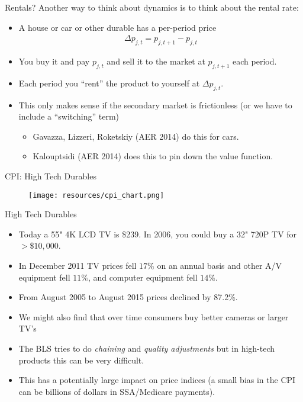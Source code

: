 \begin{frame}{Rentals?}
Another way to think about dynamics is to think about the rental rate:
\begin{itemize}
\item A house or car or other durable has a per-period price
\begin{align*}
\Delta p_{j,t}=p_{j,t+1} - p_{j,t}
\end{align*}
\item You buy it and pay $p_{j,t}$ and sell it to the market at $p_{j,t+1}$ each period.
\item Each period you ``rent'' the product to yourself at $\Delta p_{j,t}$.
\item This only makes sense if the secondary market is frictionless (or we have to include a ``switching'' term)
\begin{itemize}
	\item Gavazza, Lizzeri, Roketskiy (AER 2014) do this for cars.
	\item Kalouptsidi (AER 2014) does this to pin down the value function.
\end{itemize}
\end{itemize}
\end{frame}



\begin{frame}{CPI: High Tech Durables}
\begin{figure}[htbp]
\begin{center}
\texttt{[image: resources/cpi\_chart.png]}
\label{gandr2}
\end{center}
\end{figure}
\end{frame}


\begin{frame}{High Tech Durables}
\begin{itemize}
\item Today a 55" 4K LCD TV is \$239. In 2006, you could buy a 32" 720P TV for $>\$10,000$.
\item In December 2011 TV prices fell $17\%$ on an annual basis and other A/V equipment fell $11\%$, and computer equipment fell $14\%$.
\item From August 2005 to August 2015 prices declined by 87.2\%.
\item We might also find that over time consumers buy better cameras or larger TV's
\item The BLS tries to do \textit{chaining} and \textit{quality adjustments} but in high-tech products this can be very difficult.
\item This has a potentially large impact on price indices (a small bias in the CPI can be billions of dollars in SSA/Medicare payments).
\end{itemize}
\end{frame}


